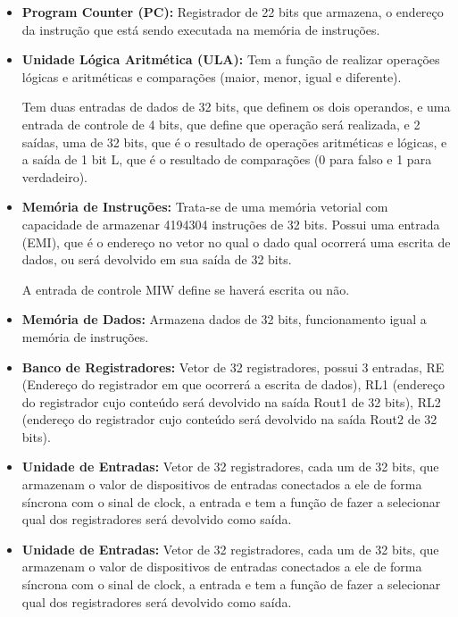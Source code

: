 \begin{itemize}

\item \textbf{Program Counter (PC):} Registrador de 22 bits que armazena, o endereço da instrução que está sendo executada na memória de instruções.

\item \textbf{Unidade Lógica Aritmética (ULA):} Tem a função de realizar operações lógicas e aritméticas e comparações (maior, menor, igual e diferente).

Tem duas entradas de dados de 32 bits, que definem os dois operandos, e uma entrada de controle de 4 bits, que define que operação será realizada, e 2 saídas, uma de 32 bits, que é o resultado de operações aritméticas e lógicas, e a saída de 1 bit L, que é o resultado de comparações (0 para falso e 1 para verdadeiro).

\item \textbf{Memória de Instruções: }Trata-se de uma memória vetorial com capacidade de armazenar 4194304 instruções de 32 bits.
Possui uma entrada (EMI), que é o endereço no vetor no qual o dado qual ocorrerá uma escrita de dados, ou será devolvido em sua saída de 32 bits.

A entrada de controle MIW define se haverá escrita ou não. 

\item \textbf{Memória de Dados:} Armazena dados de 32 bits, funcionamento igual a memória de instruções.

\item \textbf{Banco de Registradores:} Vetor de 32 registradores, possui 3 entradas, RE (Endereço do registrador em que ocorrerá a escrita de dados), RL1 (endereço do registrador cujo conteúdo será devolvido na saída Rout1 de 32 bits), RL2 (endereço do registrador cujo conteúdo será devolvido na saída Rout2 de 32 bits).

\item \textbf{Unidade de Entradas:} Vetor de 32 registradores, cada um de 32 bits, que armazenam o valor de dispositivos de entradas conectados a ele de forma síncrona com o sinal de clock, a entrada e tem a função de fazer a selecionar qual dos registradores será devolvido como saída.

\item \textbf{Unidade de Entradas:} Vetor de 32 registradores, cada um de 32 bits, que armazenam o valor de dispositivos de entradas conectados a ele de forma síncrona com o sinal de clock, a entrada e tem a função de fazer a selecionar qual dos registradores será devolvido como saída.


\end{itemize}
